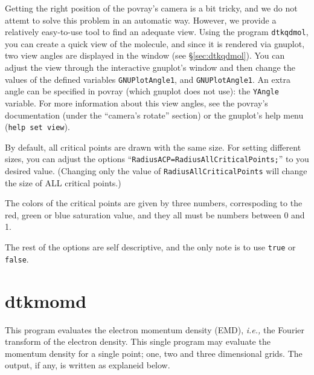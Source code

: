 Getting the right position of the povray's camera is a bit tricky, and we do not attemt to solve this problem in an automatic way. However, we provide a relatively easy-to-use tool to find an adequate view. Using the program \texttt{dtkqdmol}, you can create a quick view of the molecule, and since it is rendered via gnuplot, two view angles are displayed in the window (see \S\ref{sec:dtkqdmol}). You can adjust the view through the interactive gnuplot's window and then change the values of the defined variables \texttt{GNUPlotAngle1}, and \texttt{GNUPlotAngle1}. An extra angle can be specified in povray (which gnuplot does not use): the \texttt{YAngle} variable. For more information about this view angles, see the povray's documentation (under the ``camera's rotate'' section) or the gnuplot's help menu (\texttt{help set view}).

By default, all critical points are drawn with the same size. For setting different sizes, you can adjust the options ``\texttt{RadiusACP=RadiusAllCriticalPoints;}'' to you desired value. (Changing only the value of \texttt{RadiusAllCriticalPoints} will change the size of ALL critical points.)

The colors of the critical points are given by three numbers, correspoding to the red, green or blue saturation value, and they all must be numbers between 0 and 1.

The rest of the options are self descriptive, and the only note is to use \texttt{true} or \texttt{false}.

\section{dtkmomd}

This program evaluates the electron momentum density (EMD), \textit{i.e.,} the Fourier transform of the electron density. This single program may evaluate the momentum density for a single point; one, two and three dimensional grids. The output, if any, is written as explaneid below.

